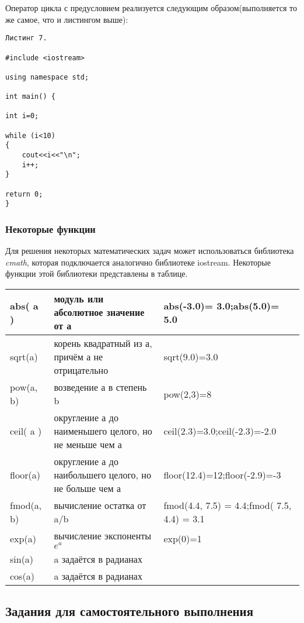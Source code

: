 \documentclass[a4paper,report,14pt]{ncc}
\begin{document}
Оператор цикла с предусловием реализуется следующим образом(выполняется то же самое, что и листингом выше):

\begin{verbatim}
Листинг 7.

#include <iostream>

using namespace std;

int main() {

int i=0;

while (i<10)
{
	cout<<i<<"\n";
	i++;
}

return 0;
}

\end{verbatim}


\subsubsection{Некоторые функции}

Для решения некоторых математических задач может использоваться библиотека \textit{cmath}, которая подключается аналогично библиотеке iostream. Некоторые функции этой библиотеки представлены в таблице.

\begin{tabular}{|l|p{7cm}|p{5cm}|}
\hline
abs( a ) & модуль или абсолютное значение от а & abs(-3.0)= 3.0;abs(5.0)= 5.0\\\hline
sqrt(a) & корень квадратный из а, причём а не отрицательно & sqrt(9.0)=3.0\\\hline
pow(a, b) & возведение  а в степень b & pow(2,3)=8\\\hline
ceil( a ) & округление а до наименьшего целого, но не меньше чем а & ceil(2.3)=3.0;ceil(-2.3)=-2.0\\\hline
floor(a) & округление а до наибольшего целого, но не больше чем а & floor(12.4)=12;floor(-2.9)=-3\\\hline
fmod(a, b) & вычисление остатка от  a/b & fmod(4.4, 7.5) = 4.4;fmod( 7.5, 4.4) = 3.1\\\hline
exp(a) & вычисление экспоненты $e^a$ & exp(0)=1\\\hline
sin(a) & a задаётся в радианах & \\\hline
cos(a) & a задаётся в радианах & \\\hline
\end{tabular}



\subsection{Задания для самостоятельного выполнения}
\end{document}
